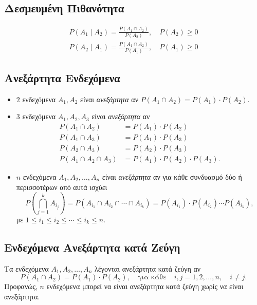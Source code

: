 \subsection*{Δεσμευμένη Πιθανότητα}

  \begin{gather*}
    P(A_{1} \mid A_{2}) = \frac{P(A_{1} \cap A_{2})}{P(A_{2})}, \quad P(A_{2}) \geq 0 \\
    P(A_{2} \mid A_{1}) = \frac{P(A_{1} \cap A_{2})}{P(A_{1})}, \quad P(A_{1}) \geq 0
  \end{gather*}

\subsection*{Ανεξάρτητα Ενδεχόμενα}

\begin{itemize}
  \item $2$ ενδεχόμενα $A_{1}, A_{2}$ είναι \textit{ανεξάρτητα} αν $P(A_{1} \cap A_{2}) =  P(A_{1}) \cdot P(A_{2})$.
  \item $3$ ενδεχόμενα $A_{1}, A_{2}, A_{3}$ είναι \textit{ανεξάρτητα} αν
  \begin{align*}
    P(A_{1} \cap A_{2}) &=  P(A_{1}) \cdot P(A_{2}) \\
    P(A_{1} \cap A_{3}) &=  P(A_{1}) \cdot P(A_{3}) \\
    P(A_{2} \cap A_{3}) &=  P(A_{2}) \cdot P(A_{3}) \\
    P(A_{1} \cap A_{2} \cap A_{3}) &=  P(A_{1}) \cdot P(A_{2}) \cdot P(A_{3}).
  \end{align*}
  \item $n$ ενδεχόμενα $A_{1}, A_{2}, \ldots, A_{n}$ είναι \textit{ανεξάρτητα} αν για κάθε συνδυασμό δύο ή περισσοτέρων από αυτά ισχύει
\[
P\left(\bigcap\limits_{j=1}^{k}A_{i_{j}}\right)=P(A_{i_{1}} \cap A_{i_{2}} \cap \cdots \cap A_{i_{k}}) = P(A_{i_{1}}) \cdot P(A_{i_{2}}) \cdots P(A_{i_{k}}),
\]
με $1 \leq i_{1} \leq i_{2} \leq \cdots \leq i_{k} \leq n$.
\end{itemize}

\subsection*{Ενδεχόμενα Ανεξάρτητα κατά Ζεύγη}

Τα ενδεχόμενα  $A_{1}, A_{2}, \ldots, A_{n}$ λέγονται ανεξάρτητα κατά ζεύγη αν
\[
 P(A_{1} \cap A_{2}) =  P(A_{1}) \cdot P(A_{2}), \quad \text{για κάθε} \quad i,j = 1,2, \ldots, n, \quad i \neq j.
\]
 Προφανώς, $n$ ενδεχόμενα μπορεί να είναι ανεξάρτητα κατά ζεύγη χωρίς να είναι ανεξάρτητα.

